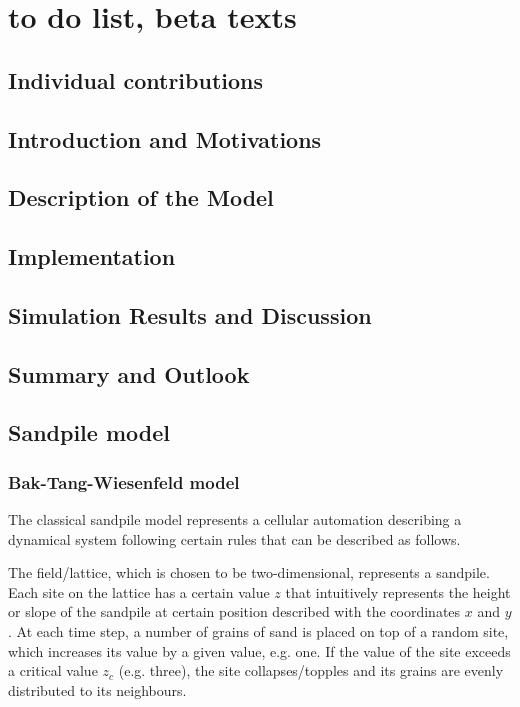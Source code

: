 \chapter{to do list, beta texts}
\thispagestyle{fancy}


\section{Individual contributions}

\section{Introduction and Motivations}

\section{Description of the Model}

\section{Implementation}

\section{Simulation Results and Discussion}

\section{Summary and Outlook}

\section{Sandpile model}

\subsection{Bak-Tang-Wiesenfeld model}

The classical sandpile model represents a cellular automation describing a dynamical system following certain rules that can be described as follows.

The field/lattice, which is chosen to be two-dimensional, represents a sandpile. Each site on the lattice has a certain value $z$ that intuitively represents the height or slope of the sandpile at certain position described with the coordinates $x$ and $y$. At each time step, a number of grains of sand is placed on top of a random site, which increases its value by a given value, e.g. one. If the value of the site exceeds a critical value $z_c$ (e.g. three), the site collapses/topples and its grains are evenly distributed to its neighbours.

